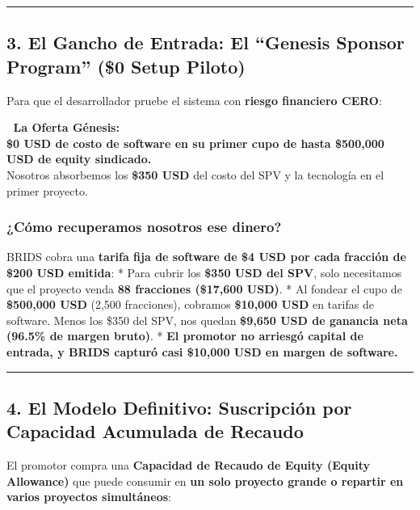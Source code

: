 \documentclass[
]{article}
\renewenvironment{quote}{%
  \vspace{0.4em}
  \begin{tcolorbox}[
    colback=bridsLight,
    colframe=bridsBlue,
    arc=2mm,
    boxrule=1.2pt,
    left=10pt,
    right=10pt,
    top=8pt,
    bottom=8pt,
    before skip=6pt,
    after skip=8pt
  ]%
}{%
  \end{tcolorbox}%
}
\begin{document}
\begin{center}\rule{0.5\linewidth}{0.5pt}\end{center}

\subsection{3. El Gancho de Entrada: El ``Genesis Sponsor Program'' (\$0
Setup
Piloto)}\label{el-gancho-de-entrada-el-genesis-sponsor-program-0-setup-piloto}

Para que el desarrollador pruebe el sistema con \textbf{riesgo
financiero CERO}:

\begin{quote}
🎯 \textbf{La Oferta Génesis:}\\
\textbf{\$0 USD de costo de software en su primer cupo de hasta
\$500,000 USD de equity sindicado.}\\
Nosotros absorbemos los \textbf{\$350 USD} del costo del SPV y la
tecnología en el primer proyecto.
\end{quote}

\subsubsection{¿Cómo recuperamos nosotros ese
dinero?}\label{cuxf3mo-recuperamos-nosotros-ese-dinero}

BRIDS cobra una \textbf{tarifa fija de software de \$4 USD por cada
fracción de \$200 USD emitida}: * Para cubrir los \textbf{\$350 USD del
SPV}, solo necesitamos que el proyecto venda \textbf{88 fracciones
(\$17,600 USD)}. * Al fondear el cupo de \textbf{\$500,000 USD} (2,500
fracciones), cobramos \textbf{\$10,000 USD} en tarifas de software.
Menos los \$350 del SPV, nos quedan \textbf{\$9,650 USD de ganancia neta
(96.5\% de margen bruto)}. * \textbf{El promotor no arriesgó capital de
entrada, y BRIDS capturó casi \$10,000 USD en margen de software.}

\begin{center}\rule{0.5\linewidth}{0.5pt}\end{center}

\subsection{4. El Modelo Definitivo: Suscripción por Capacidad Acumulada
de
Recaudo}\label{el-modelo-definitivo-suscripciuxf3n-por-capacidad-acumulada-de-recaudo}

El promotor compra una \textbf{Capacidad de Recaudo de Equity (Equity
Allowance)} que puede consumir en \textbf{un solo proyecto grande o
repartir en varios proyectos simultáneos}:
\end{document}
